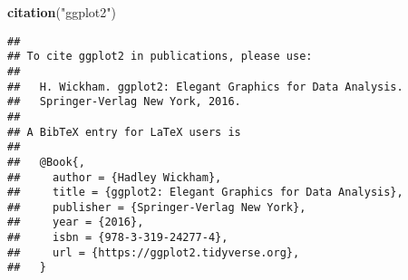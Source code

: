 \documentclass[
]{article}
\newenvironment{Shaded}{\begin{snugshade}}{\end{snugshade}}
\newcommand{\KeywordTok}[1]{\textcolor[rgb]{0.13,0.29,0.53}{\textbf{#1}}}
\newcommand{\NormalTok}[1]{#1}
\newcommand{\StringTok}[1]{\textcolor[rgb]{0.31,0.60,0.02}{#1}}
\begin{document}
\begin{Shaded}
\begin{Highlighting}[]
\KeywordTok{citation}\NormalTok{(}\StringTok{"ggplot2"}\NormalTok{)}
\end{Highlighting}
\end{Shaded}

\begin{verbatim}
## 
## To cite ggplot2 in publications, please use:
## 
##   H. Wickham. ggplot2: Elegant Graphics for Data Analysis.
##   Springer-Verlag New York, 2016.
## 
## A BibTeX entry for LaTeX users is
## 
##   @Book{,
##     author = {Hadley Wickham},
##     title = {ggplot2: Elegant Graphics for Data Analysis},
##     publisher = {Springer-Verlag New York},
##     year = {2016},
##     isbn = {978-3-319-24277-4},
##     url = {https://ggplot2.tidyverse.org},
##   }
\end{verbatim}
\end{document}
